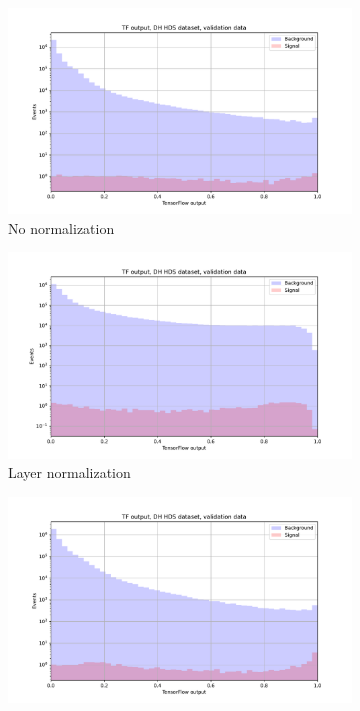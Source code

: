 \documentclass[12pt, a4paper]{book}
\begin{document}
\graphicspath{{../../Plots/NeuralNetwork/Normalization_method/}}
\begin{figure}[!ht]
	\centering
	\begin{subfigure}[b]{0.49\textwidth}
      \centering
      \includegraphics[width=1\textwidth]{NoNorm/VAL_pre.pdf}
      \caption{No normalization}
   \end{subfigure}
   \hfill
   \begin{subfigure}[b]{0.49\textwidth}
      \centering
      \includegraphics[width=1\textwidth]{LayerNorm/VAL_pre.pdf}
      \caption{Layer normalization}
   \end{subfigure}
   \hfill
	\begin{subfigure}[b]{0.49\textwidth}
      \centering
      \includegraphics[width=1\textwidth]{minmax/VAL_pre.pdf}

\end{subfigure}
\end{figure}
\end{document}
